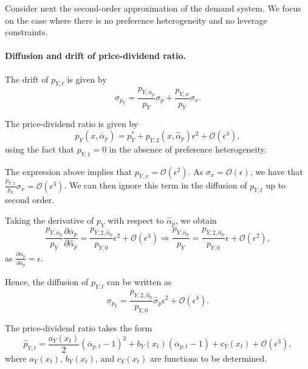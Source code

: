 Consider next the second-order approximation of the demand system. 
We focus on the case where there is no preference heterogeneity and no leverage constraints.

\paragraph{Diffusion and drift of price-dividend ratio.} The drift of $p_{Y,t}$ is given by
\begin{equation}
    \sigma_{p_Y} = \frac{p_{Y,\overline{\alpha}_p}}{p_{Y}} \sigma_{p} + \frac{p_{Y,x}}{p_{Y}} \sigma_{x}.
\end{equation}

The price-dividend ratio is given by
\begin{equation}
    p_{Y}(x, \overline{\alpha}_p) =p_{Y}^*+ p_{Y,2}(x, \hat{\alpha}_p)\epsilon^2 + \mathcal{O}(\epsilon^3),
\end{equation}
using the fact that $p_{Y,1} = 0$ in the absence of preference heterogeneity.

The expression above implies that $p_{Y,x} = \mathcal{O}(\epsilon^2)$.
As $\sigma_{x} = \mathcal{O}(\epsilon)$, we have that $\frac{p_{Y,x}}{p_{Y}} \sigma_{x} = \mathcal{O}(\epsilon^3)$.
We can then ignore this term in the diffusion of $p_{Y,t}$ up to second order.

Taking the derivative of $p_{Y}$ with respect to $\hat{\alpha}_p$, we obtain
\begin{equation}
    \frac{p_{Y,\overline{\alpha}_p}}{p_{Y}} \frac{\partial \overline{\alpha}_p}{\partial \hat{\alpha}_p}= \frac{p_{Y,2, \hat{\alpha}_p}}{p_{Y,0}} \epsilon^2  +\mathcal{O}(\epsilon^3)\Rightarrow \frac{p_{Y,\overline{\alpha}_p}}{p_{Y}} = \frac{p_{Y,2, \hat{\alpha}_p}}{p_{Y,0}} \epsilon  +\mathcal{O}(\epsilon^2),
\end{equation}
as $\frac{\partial \overline{\alpha}_p}{\partial \hat{\alpha}_p} =\epsilon$.

Hence, the diffusion of $p_{Y,t}$ can be written as
\begin{equation}
    \sigma_{p_Y} =  \frac{p_{Y,2, \hat{\alpha}_p}}{p_{Y,0}} \hat{\sigma}_{p} \epsilon^2 + \mathcal{O}(\epsilon^3). 
\end{equation}

The price-dividend ratio takes the form
\begin{equation}
    \hat{p}_{Y,t} =  \frac{a_{Y}(x_t)}{2}(\overline{\alpha}_{p,t}-1)^2 + b_{Y}(x_t) (\overline{\alpha}_{p,t}-1) + c_{Y}(x_t)+ \mathcal{O}(\epsilon^3),
\end{equation}
where $a_{Y}(x_t)$, $b_{Y}(x_t)$, and $c_{Y}(x_t)$ are functions to be determined.

